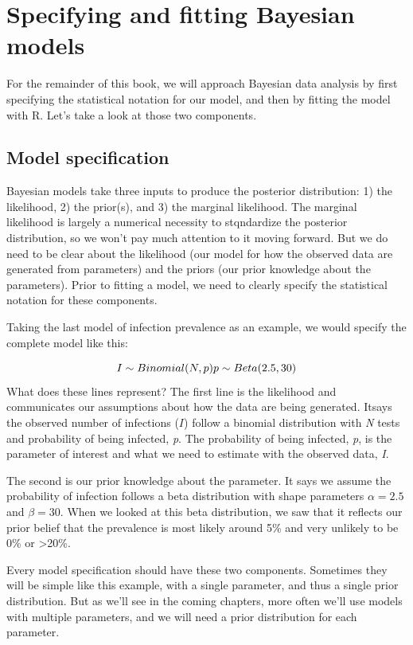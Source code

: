 \documentclass[
]{book}
\begin{document}
\section{Specifying and fitting Bayesian models}\label{specifying-and-fitting-bayesian-models}

For the remainder of this book, we will approach Bayesian data analysis by first specifying the statistical notation for our model, and then by fitting the model with R. Let's take a look at those two components.

\subsection{Model specification}\label{model-specification}

Bayesian models take three inputs to produce the posterior distribution: 1) the likelihood, 2) the prior(s), and 3) the marginal likelihood. The marginal likelihood is largely a numerical necessity to stqndardize the posterior distribution, so we won't pay much attention to it moving forward. But we do need to be clear about the likelihood (our model for how the observed data are generated from parameters) and the priors (our prior knowledge about the parameters). Prior to fitting a model, we need to clearly specify the statistical notation for these components.

Taking the last model of infection prevalence as an example, we would specify the complete model like this:

\[
I \sim Binomial(N, p) \\
p \sim Beta(2.5, 30)
\]
What does these lines represent? The first line is the likelihood and communicates our assumptions about how the data are being generated. Itsays the observed number of infections (\(I\)) follow a binomial distribution with \emph{N} tests and probability of being infected, \emph{p}. The probability of being infected, \emph{p}, is the parameter of interest and what we need to estimate with the observed data, \emph{I}.

The second is our prior knowledge about the parameter. It says we assume the probability of infection follows a beta distribution with shape parameters \(\alpha = 2.5\) and \(\beta = 30\). When we looked at this beta distribution, we saw that it reflects our prior belief that the prevalence is most likely around 5\% and very unlikely to be 0\% or \textgreater20\%.

Every model specification should have these two components. Sometimes they will be simple like this example, with a single parameter, and thus a single prior distribution. But as we'll see in the coming chapters, more often we'll use models with multiple parameters, and we will need a prior distribution for each parameter.
\end{document}
